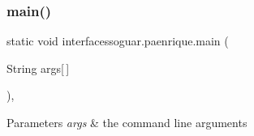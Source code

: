 \subsubsection{\texorpdfstring{main()}{main()}}
{\footnotesize\ttfamily static void interfacessoguar.\+paenrique.\+main (\begin{DoxyParamCaption}\item[{String}]{args\mbox{[}$\,$\mbox{]} }\end{DoxyParamCaption})\hspace{0.3cm}{\ttfamily [inline]}, {\ttfamily [static]}}


\begin{DoxyParams}{Parameters}
{\em args} & the command line arguments \\
\hline
\end{DoxyParams}

